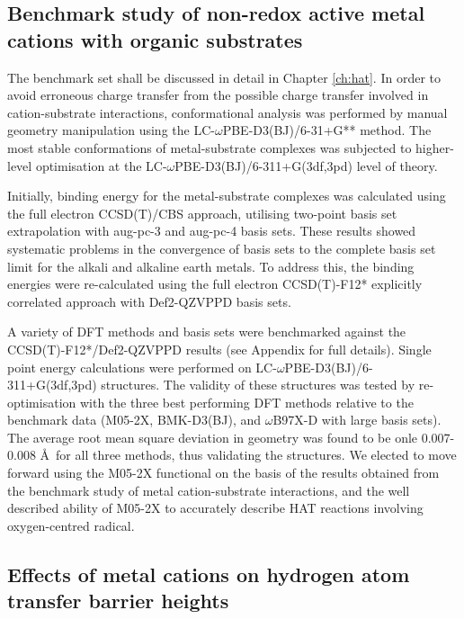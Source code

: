 \subsection{Benchmark study of non-redox active metal cations with organic
  substrates}

The benchmark set shall be discussed in detail in Chapter \ref{ch:hat}. In order
to avoid erroneous charge transfer from the possible charge transfer involved in
cation-substrate interactions, conformational analysis was performed by manual
geometry manipulation using the LC-$\omega$PBE-D3(BJ)/6-31+G**
method.\cite{Johnson2013a} The most stable conformations of metal-substrate
complexes was subjected to higher-level optimisation at the
LC-$\omega$PBE-D3(BJ)/6-311+G(3df,3pd) level of theory.

Initially, binding energy for the metal-substrate complexes was calculated using
the full electron CCSD(T)/CBS approach, utilising two-point basis set
extrapolation with aug-pc-3 and aug-pc-4 basis sets. These results showed
systematic problems in the convergence of basis sets to the complete basis set
limit for the alkali and alkaline earth metals. To address this, the binding
energies were re-calculated using the full electron CCSD(T)-F12* explicitly
correlated approach\cite{Hattig2010} with Def2-QZVPPD basis sets.

A variety of DFT methods and basis sets were benchmarked against the
CCSD(T)-F12*/Def2-QZVPPD results (see Appendix  for full
details). Single point energy calculations were performed on
LC-$\omega$PBE-D3(BJ)/6-311+G(3df,3pd) structures. The validity of these
structures was tested by re-optimisation with the three best performing DFT
methods relative to the benchmark data (M05-2X, BMK-D3(BJ), and $\omega$B97X-D
with large basis sets). The average root mean square deviation in geometry was
found to be onle 0.007-0.008 \AA ~for all three methods, thus validating the
structures. We elected to move forward using the M05-2X functional on the basis
of the results obtained from the benchmark study of metal cation-substrate
interactions, and the well described ability of M05-2X to accurately describe
HAT reactions involving oxygen-centred radical.\cite{Galano2013}


\subsection{Effects of metal cations on hydrogen atom transfer barrier heights}




